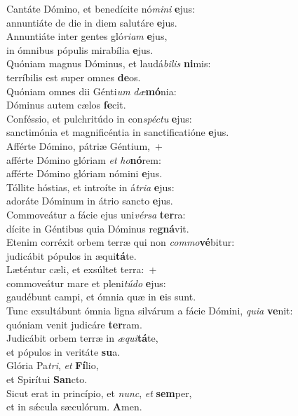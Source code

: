 \evenverse Cantáte Dómino, et benedícite nó\textit{mi}\textit{ni} \textbf{e}jus:~\*\\
\evenverse annuntiáte de die in diem salutáre \textbf{e}jus.\\
\oddverse Annuntiáte inter gentes gló\textit{ri}\textit{am} \textbf{e}jus,~\*\\
\oddverse in ómnibus pópulis mirabília \textbf{e}jus.\\
\evenverse Quóniam magnus Dóminus, et laudá\textit{bi}\textit{lis} \textbf{ni}mis:~\*\\
\evenverse terríbilis est super omnes \textbf{de}os.\\
\oddverse Quóniam omnes dii Génti\textit{um} \textit{dæ}\textbf{mó}nia:~\*\\
\oddverse Dóminus autem cælos \textbf{fe}cit.\\
\evenverse Conféssio, et pulchritúdo in con\textit{spé}\textit{ctu} \textbf{e}jus:~\*\\
\evenverse sanctimónia et magnificéntia in sanctificatióne \textbf{e}jus.\\
\oddverse Afférte Dómino, pátriæ Géntium,~+\\
\oddverse  afférte Dómino glóriam \textit{et} \textit{ho}\textbf{nó}rem:~\*\\
\oddverse afférte Dómino glóriam nómini \textbf{e}jus.\\
\evenverse Tóllite hóstias, et introíte in á\textit{tri}\textit{a} \textbf{e}jus:~\*\\
\evenverse adoráte Dóminum in átrio sancto \textbf{e}jus.\\
\oddverse Commoveátur a fácie ejus uni\textit{vér}\textit{sa} \textbf{ter}ra:~\*\\
\oddverse dícite in Géntibus quia Dóminus re\textbf{gná}vit.\\
\evenverse Etenim corréxit orbem terræ qui non \textit{com}\textit{mo}\textbf{vé}bitur:~\*\\
\evenverse judicábit pópulos in æqui\textbf{tá}te.\\
\oddverse Læténtur cæli, et exsúltet terra:~+\\
\oddverse  commoveátur mare et pleni\textit{tú}\textit{do} \textbf{e}jus:~\*\\
\oddverse gaudébunt campi, et ómnia quæ in \textbf{e}is sunt.\\
\evenverse Tunc exsultábunt ómnia ligna silvárum a fácie Dómini, \textit{qui}\textit{a} \textbf{ve}nit:~\*\\
\evenverse quóniam venit judicáre \textbf{ter}ram.\\
\oddverse Judicábit orbem terræ in \textit{æ}\textit{qui}\textbf{tá}te,~\*\\
\oddverse et pópulos in veritáte \textbf{su}a.\\
\evenverse Glória Pa\textit{tri}, \textit{et} \textbf{Fí}lio,~\*\\
\evenverse et Spirítui \textbf{San}cto.\\
\oddverse Sicut erat in princípio, et \textit{nunc}, \textit{et} \textbf{sem}per,~\*\\
\oddverse et in sǽcula sæculórum. \textbf{A}men.\\
